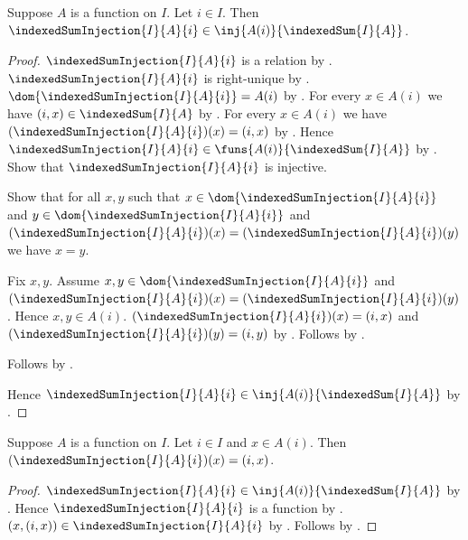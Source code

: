 \begin{proposition}\label{indexed_sum_injection_type}
    Suppose $A$ is a function on $I$.
    Let $i\in I$.
    Then $\indexedSumInjection{I}{A}{i}
        \in\inj{A(i)}{\indexedSum{I}{A}}$.
\end{proposition}
\begin{proof}
    $\indexedSumInjection{I}{A}{i}$ is a relation by
        .
    $\indexedSumInjection{I}{A}{i}$ is right-unique by
        .
    $\dom{\indexedSumInjection{I}{A}{i}}=A(i)$ by
        .
    For every $x\in A(i)$ we have $(i,x)\in\indexedSum{I}{A}$
        by .
    For every $x\in A(i)$ we have
        $(\indexedSumInjection{I}{A}{i})(x)=(i,x)$ by
        .
    Hence $\indexedSumInjection{I}{A}{i}
        \in\funs{A(i)}{\indexedSum{I}{A}}$ by .
    Show that $\indexedSumInjection{I}{A}{i}$ is injective.
    \begin{subproof}
        Show that for all $x,y$ such that
            $x\in\dom{\indexedSumInjection{I}{A}{i}}$ and
            $y\in\dom{\indexedSumInjection{I}{A}{i}}$ and
            $(\indexedSumInjection{I}{A}{i})(x)
                =(\indexedSumInjection{I}{A}{i})(y)$
            we have $x=y$.
        \begin{subproof}
            Fix $x,y$.
            Assume $x,y\in\dom{\indexedSumInjection{I}{A}{i}}$ and
                $(\indexedSumInjection{I}{A}{i})(x)
                    =(\indexedSumInjection{I}{A}{i})(y)$.
            Hence $x,y\in A(i)$.
            $(\indexedSumInjection{I}{A}{i})(x)=(i,x)$ and
                $(\indexedSumInjection{I}{A}{i})(y)=(i,y)$ by
                .
            Follows by .
        \end{subproof}
        Follows by .
    \end{subproof}
    Hence $\indexedSumInjection{I}{A}{i}
        \in\inj{A(i)}{\indexedSum{I}{A}}$
        by .
\end{proof}

\begin{proposition}\label{indexed_sum_injection_apply}
    Suppose $A$ is a function on $I$.
    Let $i\in I$ and $x\in A(i)$.
    Then $(\indexedSumInjection{I}{A}{i})(x)=(i,x)$.
\end{proposition}
\begin{proof}
    $\indexedSumInjection{I}{A}{i}
        \in\inj{A(i)}{\indexedSum{I}{A}}$ by
        .
    Hence $\indexedSumInjection{I}{A}{i}$ is a function by
        .
    $(x,(i,x))\in\indexedSumInjection{I}{A}{i}$ by
        .
    Follows by .
\end{proof}

